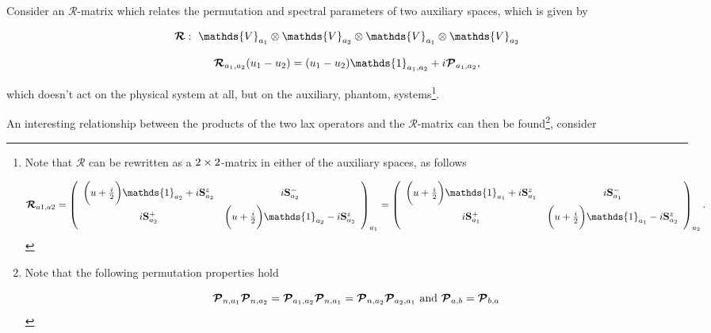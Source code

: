 \documentclass{homework}
\begin{document}
\begin{df}
Consider an $\bm{\mathcal{R}}$-matrix which relates the permutation and spectral parameters of two auxiliary spaces, which is given by  

\begin{equation}
\begin{array}{c}
     \bm{\mathcal{R}}: \blanky \mathds{V}_{a_1} \otimes \mathds{V}_{a_2} \otimes \mathds{V}_{a_1} \otimes \mathds{V}_{a_2} \\ 
     \\
     \bm{\mathcal{R}}_{a_1, a_2}(u_1-u_2) = (u_1-u_2) \mathds{1}_{a_1, a_2} + i \bm{\mathcal{P}}_{a_1, a_2}, \\
     \label{R-matrix def}
\end{array}
\end{equation}

which doesn't act on the physical system at all, but on the auxiliary, phantom, systems\footnote{Note that $\bm{\mathcal{R}}$ can be rewritten as a $2 \times 2$-matrix in either of the auxiliary spaces, as follows

\begin{equation}
    \bm{\mathcal{R}}_{a1, a2} = \left(\begin{array}{cc}
        \bigg(u + \frac{i}{2}\bigg) \mathds{1}_{a_2} + i \spin_{a_2}^z & i \spin_{a_2}^{-} \\
        i \spin_{a_2}^{+}  & \bigg(u + \frac{i}{2}\bigg) \mathds{1}_{a_2} - i \spin_{a_2}^z 
    \end{array} \right)_{a_1} = \left(\begin{array}{cc}
        \bigg(u + \frac{i}{2}\bigg) \mathds{1}_{a_1} + i \spin_{a_1}^z & i \spin_{a_1}^{-} \\
        i \spin_{a_1}^{+}  & \bigg(u + \frac{i}{2}\bigg) \mathds{1}_{a_1} - i \spin_{a_2}^z 
    \end{array} \right)_{a_2}.
\end{equation}}.
\end{df}

An interesting relationship between the products of the two lax operators and the $\bm{\mathcal{R}}$-matrix can then be found\footnote{Note that the following permutation properties hold 

\begin{equation}
\bm{\mathcal{P}}_{n, a_1}\bm{\mathcal{P}}_{n, a_2} = \bm{\mathcal{P}}_{a_1, a_2}\bm{\mathcal{P}}_{n, a_1} = \bm{\mathcal{P}}_{n, a_2}\bm{\mathcal{P}}_{a_2, a_1} \textnormal{ and } \bm{\mathcal{P}}_{a, b} = \bm{\mathcal{P}}_{b, a}
\end{equation}

}, consider 
\end{document}
